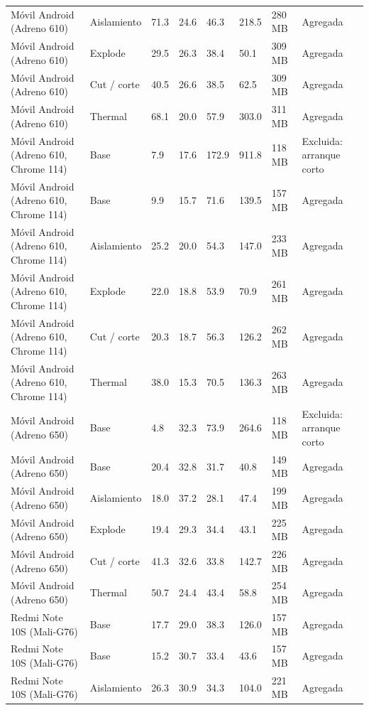 {\begin{longtable}{p{3.3cm}p{2.9cm}p{1.2cm}p{1.1cm}p{1.4cm}p{1.4cm}p{1.6cm}p{2.5cm}}
    Móvil Android (Adreno 610) & Aislamiento & 71.3 & 24.6 & 46.3 & 218.5 & 280 MB & Agregada \\
    Móvil Android (Adreno 610) & Explode & 29.5 & 26.3 & 38.4 & 50.1 & 309 MB & Agregada \\
    Móvil Android (Adreno 610) & Cut / corte & 40.5 & 26.6 & 38.5 & 62.5 & 309 MB & Agregada \\
    Móvil Android (Adreno 610) & Thermal & 68.1 & 20.0 & 57.9 & 303.0 & 311 MB & Agregada \\
    Móvil Android (Adreno 610, Chrome 114) & Base & 7.9 & 17.6 & 172.9 & 911.8 & 118 MB & Excluida: arranque corto \\
    Móvil Android (Adreno 610, Chrome 114) & Base & 9.9 & 15.7 & 71.6 & 139.5 & 157 MB & Agregada \\
    Móvil Android (Adreno 610, Chrome 114) & Aislamiento & 25.2 & 20.0 & 54.3 & 147.0 & 233 MB & Agregada \\
    Móvil Android (Adreno 610, Chrome 114) & Explode & 22.0 & 18.8 & 53.9 & 70.9 & 261 MB & Agregada \\
    Móvil Android (Adreno 610, Chrome 114) & Cut / corte & 20.3 & 18.7 & 56.3 & 126.2 & 262 MB & Agregada \\
    Móvil Android (Adreno 610, Chrome 114) & Thermal & 38.0 & 15.3 & 70.5 & 136.3 & 263 MB & Agregada \\
    Móvil Android (Adreno 650) & Base & 4.8 & 32.3 & 73.9 & 264.6 & 118 MB & Excluida: arranque corto \\
    Móvil Android (Adreno 650) & Base & 20.4 & 32.8 & 31.7 & 40.8 & 149 MB & Agregada \\
    Móvil Android (Adreno 650) & Aislamiento & 18.0 & 37.2 & 28.1 & 47.4 & 199 MB & Agregada \\
    Móvil Android (Adreno 650) & Explode & 19.4 & 29.3 & 34.4 & 43.1 & 225 MB & Agregada \\
    Móvil Android (Adreno 650) & Cut / corte & 41.3 & 32.6 & 33.8 & 142.7 & 226 MB & Agregada \\
    Móvil Android (Adreno 650) & Thermal & 50.7 & 24.4 & 43.4 & 58.8 & 254 MB & Agregada \\
    Redmi Note 10S (Mali-G76) & Base & 17.7 & 29.0 & 38.3 & 126.0 & 157 MB & Agregada \\
    Redmi Note 10S (Mali-G76) & Base & 15.2 & 30.7 & 33.4 & 43.6 & 157 MB & Agregada \\
    Redmi Note 10S (Mali-G76) & Aislamiento & 26.3 & 30.9 & 34.3 & 104.0 & 221 MB & Agregada \\

\end{longtable}}
